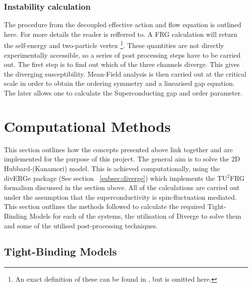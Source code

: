 \documentclass[12pt]{article}
\begin{document}
\medskip





\subsubsection{Instability calculation}

The procedure from the decoupled  effective action and flow equation is outlined here. For more details the reader is refferred to\cite{profe2023functional}. 
A FRG calculation will return the self-energy and two-particle vertex \footnote{An exact definition of these can be found in \cite{metzner2012functional}, but is omitted here.}. These quantities are
not directly experimentally accessible, so a series of post processing steps have to be carried out. The first step is to find out which of the three channels diverge. 
This gives the diverging susceptibility. Mean-Field analysis is then carried out at the critical scale in order to obtain
the ordering symmetry and a linearised gap equation. The later allows one to calculate the Superconducting gap and order parameter. 



\section{Computational Methods}

This section outlines how the concepts presented above link together and are implemented for the purpose of this project. 
The general aim is to solve the 2D Hubbard-(Kanamori) model. This is achieved computationally, using the divERGe package (See section ~\ref{subsec:diverge}) which implements the TU$^2$FRG
formalism discussed in the section above. All of the calculations are carried out under the assumption that the superconductivity 
is spin-fluctuation mediated. This section outlines the methods followed to calculate the required Tight-Binding Models for each of the systems, the utilisation of 
Diverge to solve them and some of the utilised post-processing techniques. 

\subsection{Tight-Binding Models}

\label{subsec:TBM1NN2}
\end{document}
